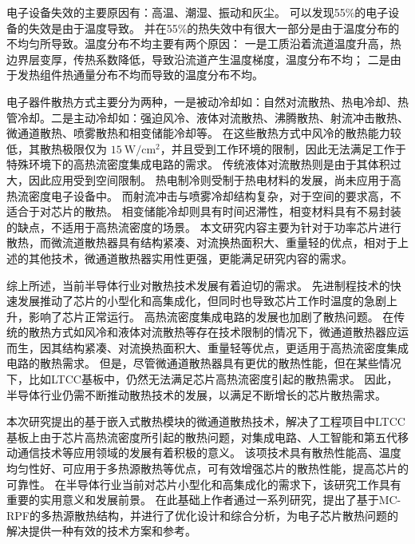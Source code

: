 电子设备失效的主要原因有：高温、潮湿、振动和灰尘\cite{He_2021}。
可以发现55\%的电子设备的失效是由于温度导致。
并在55\%的热失效中有很大一部分是由于温度分布的不均匀所导致。温度分布不均主要有两个原因：
一是工质沿着流道温度升高，热边界层变厚，传热系数降低，导致沿流道产生温度梯度，温度分布不均；
二是由于发热组件热通量分布不均而导致的温度分布不均。

电子器件散热方式主要分为两种\cite{QiWenLiang.ZhaoLiang.ea_2022}，一是被动冷却如：自然对流散热\cite{ElGhandouri.ElMaakoul.ea_2020}、热电冷却\cite{DuanFeiFan.TuShuPing_2021}、热管冷却。二是主动冷却如：强迫风冷、液体对流散热\cite{Patil.Hotta_2022}、沸腾散热\cite{Markal.Kul.ea_2022,Markal.Kul_2022}、射流冲击散热\cite{LuJing.HuangLingLi.ea_2021,Li.Sun.ea_2023}、微通道散热\cite{Manda.Peles.ea_2021,Zhang.Wu.ea_2022,Ansari.Kim_2019,Ansari.Kim_2018,Soleymani.Rahimi.ea_2020}、喷雾散热\cite{Zhou.Feng.ea_2022}和相变储能冷却\cite{DuanFeiFan.TuShuPing_2021,WangYuanJin.ZhangSai.ea_2020,Kalbasi_2021}等。
在这些散热方式中风冷的散热能力较低，其散热极限仅为 $15\ \mathrm{W/cm^2}$，并且受到工作环境的限制，因此无法满足工作于特殊环境下的高热流密度集成电路的需求。
传统液体对流散热则是由于其体积过大，因此应用受到空间限制。
热电制冷则受制于热电材料的发展，尚未应用于高热流密度电子设备中。
而射流冲击与喷雾冷却结构复杂，对于空间的要求高，不适合于对芯片的散热。
相变储能冷却则具有时间迟滞性，相变材料具有不易封装的缺点，不适用于高热流密度的场景。
本文研究内容主要为针对于功率芯片进行散热，而微流道散热器具有结构紧凑、对流换热面积大、重量轻的优点，相对于上述的其他技术，微通道散热器实用性更强，更能满足研究内容的需求。


综上所述，当前半导体行业对散热技术发展有着迫切的需求。
先进制程技术的快速发展推动了芯片的小型化和高集成化，但同时也导致芯片工作时温度的急剧上升，影响了芯片正常运行。
高热流密度集成电路的发展也加剧了散热问题。
在传统的散热方式如风冷和液体对流散热等存在技术限制的情况下，微通道散热器应运而生，因其结构紧凑、对流换热面积大、重量轻等优点，更适用于高热流密度集成电路的散热需求。
但是，尽管微通道散热器具有更优的散热性能，但在某些情况下，比如LTCC基板中，仍然无法满足芯片高热流密度引起的散热需求。
因此，半导体行业仍需不断推动散热技术的发展，以满足不断增长的芯片散热需求。

本次研究提出的基于嵌入式散热模块的微通道散热技术，解决了工程项目中LTCC基板上由于芯片高热流密度所引起的散热问题，对集成电路、人工智能和第五代移动通信技术等应用领域的发展有着积极的意义。
该项技术具有散热性能高、温度均匀性好、可应用于多热源散热等优点，可有效增强芯片的散热性能，提高芯片的可靠性。
在半导体行业当前对芯片小型化和高集成化的需求下，该研究工作具有重要的实用意义和发展前景。
在此基础上作者通过一系列研究，提出了基于MC-RPF的多热源散热结构，并进行了优化设计和综合分析，为电子芯片散热问题的解决提供一种有效的技术方案和参考。

\Nomenclature


